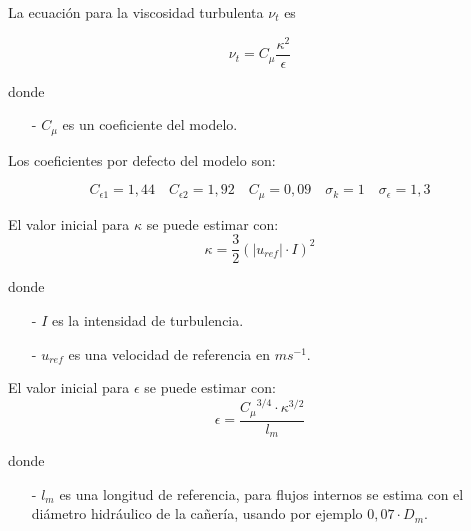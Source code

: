 La ecuación para la viscosidad turbulenta $\nu_{t}$ es

\begin{equation}\label{eq:nu_t}
  \nu_{t} = C_{\mu}\frac{\kappa^{2}}{\epsilon}
\end{equation}


donde
\begin{itemize}
        \item[-] $C_{\mu}$ es un coeficiente del modelo.
\end{itemize}

Los coeficientes por defecto del modelo son:

\begin{equation}
  C_{\epsilon 1}=1,44
  \quad
  C_{\epsilon 2}=1,92
  \quad
  C_{\mu}=0,09
  \quad
  \sigma_{k}=1
  \quad
  \sigma_{\epsilon}=1,3
\end{equation}

El valor inicial para $\kappa$ se puede estimar con:
\begin{equation}\label{eq:kappa_est}
  \kappa = \frac{3}{2} {\left( |u_{ref}| \cdot I \right)}^{2}
\end{equation}


donde
\begin{itemize}
  \item[-] $I$ es la intensidad de turbulencia.
  \item[-] $u_{ref}$ es una velocidad de referencia en $ms^{-1}$.
\end{itemize}

El valor inicial para $\epsilon$ se puede estimar con:
\begin{equation}\label{eq:epsilon_est}
  \epsilon = \frac{{C_{\mu}}^{3/4} \cdot {\kappa}^{3/2}} {l_{m}}
\end{equation}

donde
\begin{itemize}
 \item[-] $l_{m}$ es una longitud de referencia, para flujos internos se estima
con el diámetro hidráulico de la cañería, usando por ejemplo $0,07 \cdot D_{m}$.
\end{itemize}




